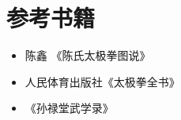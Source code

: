 \chapter{参考书籍}
\begin{itemize}
  \item 陈鑫 《陈氏太极拳图说》
  \item 人民体育出版社《太极拳全书》
  \item 《孙禄堂武学录》
\end{itemize}
